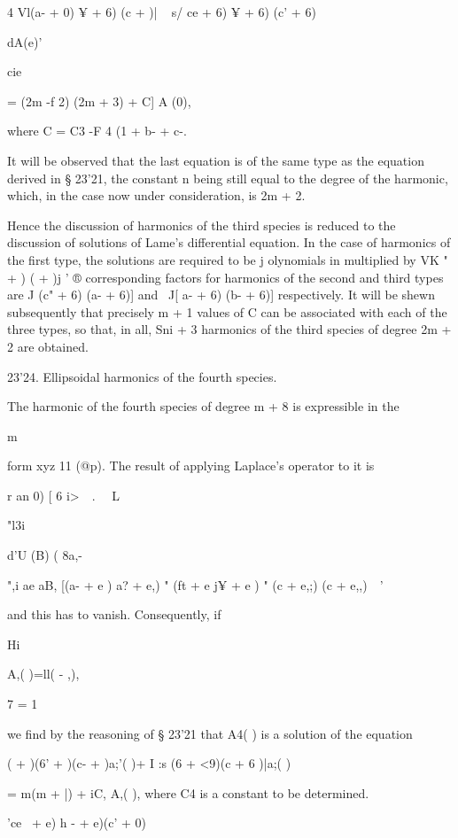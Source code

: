 {4 Vl(a- + 0) ¥ + 6) (c + )| ~ s/ ce + 6) ¥ + 6) (c' + 6)



dA(e)'

cie



= (2m -f 2) (2m + 3) + C] A (0),

where C = C3 -F 4 (1 + b- + c-.

It will be observed that the last equation is of the same type as the
equation derived in § 23'21, the constant n being still equal to the
degree of the harmonic, which, in the case now under consideration, is
2m + 2.

Hence the discussion of harmonics of the third species is reduced to
the discussion of solutions of Lame's differential equation. In the
case of harmonics of the first type, the solutions are required to be
j olynomials in multiplied by VK " + ) ( + )j ' ® corresponding
factors for harmonics of the second and third types are J (c" + 6) (a-
+ 6)] and \ J[ a- + 6) (b- + 6)] respectively. It will be shewn
subsequently that precisely m + 1 values of C can be associated with
each of the three types, so that, in all, Sni + 3 harmonics of the
third species of degree 2m + 2 are obtained.

23'24. Ellipsoidal harmonics of the fourth species.

The harmonic of the fourth species of degree m + 8 is expressible in
the

m

form xyz 11 (@p). The result of applying Laplace's operator to it is

r an 0) [ 6 i>\ \ . \ \ L

"l3i %

  d'U (B) ( 8a,- \ %

",i ae aB, [(a- + e ) a? + e,) " (ft + e j¥ + e ) " (c + e,;) (c +
e,,)\ \ '

and this has to vanish. Consequently, if

Hi

A,( )=ll( - ,),

7 = 1

we find by the reasoning of § 23'21 that A4( ) is a solution of the
equation

( + )(6' + )(c- + )a;'( )+ I :s (6 + <9)(c + 6 )|a;( )

= m(m + |) + iC, A,( ), where C4 is a constant to be determined.



 'ce~ + e) h - + e)(c' + 0) ~



}
